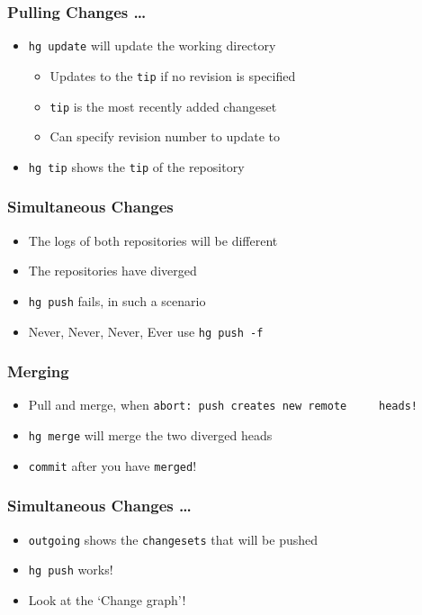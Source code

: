 \documentclass[14pt,compress]{beamer}
\newcommand{\typ}[1]{\lstinline{#1}}
\begin{document}
\begin{frame}
  \frametitle{Pulling Changes \ldots}
  \begin{itemize}
  \item \typ{hg update} will update the working directory 
    \begin{itemize}
    \item Updates to the \typ{tip} if no revision is specified
    \item \typ{tip} is the most recently added changeset 
    \item Can specify revision number to update to
    \end{itemize}
  \item \typ{hg tip} shows the \typ{tip} of the repository
  \end{itemize}
\end{frame}

\begin{frame}
  \frametitle{Simultaneous Changes}
  \begin{itemize}
  \item The logs of both repositories will be different
  \item The repositories have diverged
  \item \typ{hg push} fails, in such a scenario
  \item \alert{Never, Never, Never, Ever} use \typ{hg push -f}
  \end{itemize}
\end{frame}

\begin{frame}
  \frametitle{Merging}
  \begin{itemize}
  \item Pull and merge, when \typ{abort: push creates new remote
    heads!}
  \item \typ{hg merge} will merge the two diverged heads
  \item \typ{commit} after you have \typ{merged}!
  \end{itemize}
\end{frame}

\begin{frame}
  \frametitle{Simultaneous Changes \ldots}
  \begin{itemize}
  \item \typ{outgoing} shows the \typ{changesets} that will be pushed
  \item \typ{hg push} works!
  \item Look at the `Change graph'!
  \end{itemize}
\end{frame}
\end{document}
